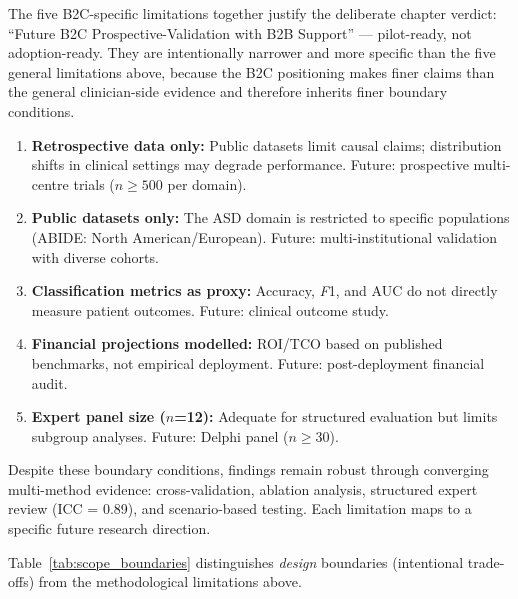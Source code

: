 \noindent The five B2C-specific limitations together justify the deliberate chapter verdict: ``Future B2C Prospective-Validation with B2B Support'' --- pilot-ready, not adoption-ready. They are intentionally narrower and more specific than the five general limitations above, because the B2C positioning makes finer claims than the general clinician-side evidence and therefore inherits finer boundary conditions.

\begin{enumerate}[nosep]
    \item \textbf{Retrospective data only:} Public datasets limit causal claims; distribution shifts in clinical settings may degrade performance. Future: prospective multi-centre trials ($n \geq 500$ per domain).
    \item \textbf{Public datasets only:} The ASD domain is restricted to specific populations (ABIDE: North American/European). Future: multi-institutional validation with diverse cohorts.
    \item \textbf{Classification metrics as proxy:} Accuracy, \textit{F}1, and AUC do not directly measure patient outcomes. Future: clinical outcome study.
    \item \textbf{Financial projections modelled:} ROI/TCO based on published benchmarks, not empirical deployment. Future: post-deployment financial audit.
    \item \textbf{Expert panel size ($n$=12):} Adequate for structured evaluation but limits subgroup analyses. Future: Delphi panel ($n \geq 30$).
\end{enumerate}

\noindent Despite these boundary conditions, findings remain robust through converging multi-method evidence: cross-validation, ablation analysis, structured expert review (ICC = 0.89), and scenario-based testing. Each limitation maps to a specific future research direction.


Table~\ref{tab:scope_boundaries} distinguishes \textit{design} boundaries (intentional trade-offs) from the methodological limitations above.

